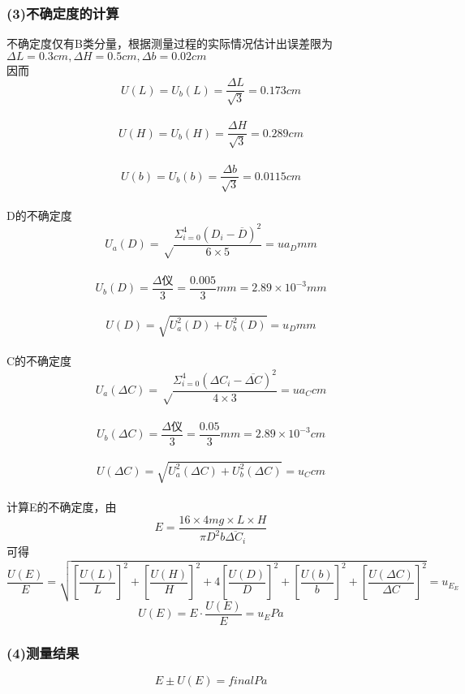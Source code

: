 \subsubsection*{(3)不确定度的计算}
\noindent
不确定度仅有B类分量，根据测量过程的实际情况估计出误差限为$\Delta L = 0.3cm, \Delta H = 0.5cm, \Delta b = 0.02cm$ \\
因而 $$U(L) = U_b(L) = \frac{\Delta L}{\sqrt{3} } = 0.173cm$$ \\
$$U(H) = U_b(H) = \frac{\Delta H}{\sqrt{3} } = 0.289cm$$ \\
$$U(b) = U_b(b) = \frac{\Delta b}{\sqrt{3} } = 0.0115cm$$ \\
D的不确定度 \\
$$U_a(D) = \sqrt\frac{\Sigma_{i=0}^4{(D_i-\overline{D})^2} }{6\times5} = {{ua_D}}mm$$ \\
$$U_b(D) = \frac{\Delta \text{仪} }{3}=\frac{0.005}{3}mm = 2.89 \times 10^{-3}mm$$ \\
$$U(D) = \sqrt{U_a^2(D) + U_b^2(D)}={{u_D}}mm$$ \\
C的不确定度 \\
$$U_a(\Delta C) = \sqrt\frac{\Sigma_{i=0}^4{(\Delta C_i-\overline{\Delta C})^2} }{4\times3} = {{ua_C}}cm$$ \\
$$U_b(\Delta C) = \frac{\Delta \text{仪} }{3}=\frac{0.05}{3}mm = 2.89 \times 10^{-3}cm$$ \\
$$U(\Delta C) = \sqrt{U_a^2(\Delta C) + U_b^2(\Delta C)}={{u_C}}cm$$ \\
计算E的不确定度，由$$E = \frac{16 \times 4mg \times L \times H}{\pi D^2b\overline{\Delta C_i} }$$可得
$$\frac{U(E)}{E}=\sqrt{ [\frac{U(L)}{L}]^2 + [\frac{U(H)}{H}]^2 + 4[\frac{U(D)}{D}]^2 + [\frac{U(b)}{b}]^2 + [\frac{U(\Delta C)}{\Delta C}]^2 } = {{u_E_E}}$$
$$U(E) = E\cdot \frac{U(E)}{E} = {{u_E}}Pa$$
\subsubsection*{(4)测量结果}
\noindent
$$E \pm U(E) = {{final}} Pa$$